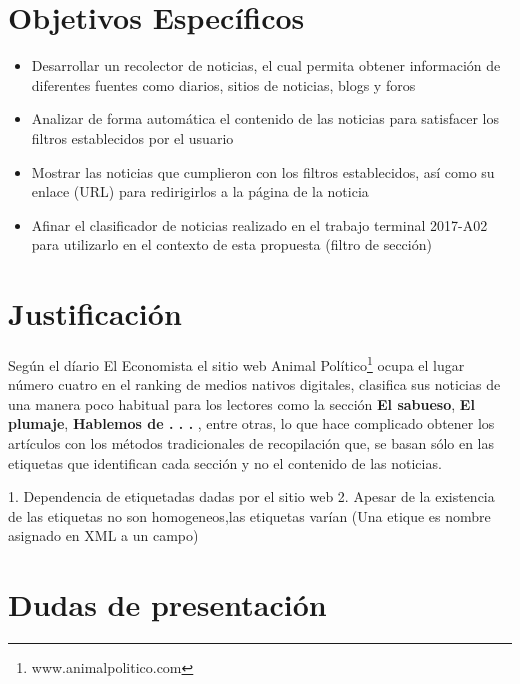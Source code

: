 \section{Objetivos Específicos}

\begin{itemize}

  \item Desarrollar un recolector de noticias, el cual permita obtener información de diferentes fuentes como diarios, sitios de noticias, blogs y foros

  \item Analizar de forma automática el contenido de las noticias para satisfacer los filtros establecidos por el usuario

  \item Mostrar las noticias que cumplieron con los filtros establecidos, así como su enlace (URL) para redirigirlos a la página de la noticia

  \item Afinar el clasificador de noticias realizado en el trabajo terminal 2017-A02 para utilizarlo en el contexto de esta propuesta (filtro de sección) 

\end{itemize}
\section{Justificación}

Según el díario El Economista \citep{SU1} el sitio web Animal Político\footnote{www.animalpolitico.com}
ocupa el lugar número cuatro en el ranking de medios nativos digitales, clasifica sus noticias de una manera poco habitual para los lectores como la sección
\textbf{El sabueso}, \textbf{El plumaje}, \textbf{Hablemos de . . . }, entre otras, lo que hace complicado obtener los artículos con los métodos tradicionales 
de recopilación que, se basan sólo en las etiquetas que identifican cada sección y no el contenido de las noticias.


	1. Dependencia de etiquetadas dadas por el sitio web
	2. Apesar de la existencia de las etiquetas no son homogeneos,las etiquetas varían (Una etique es nombre asignado en XML a un campo)

\section{Dudas de presentación}
 
